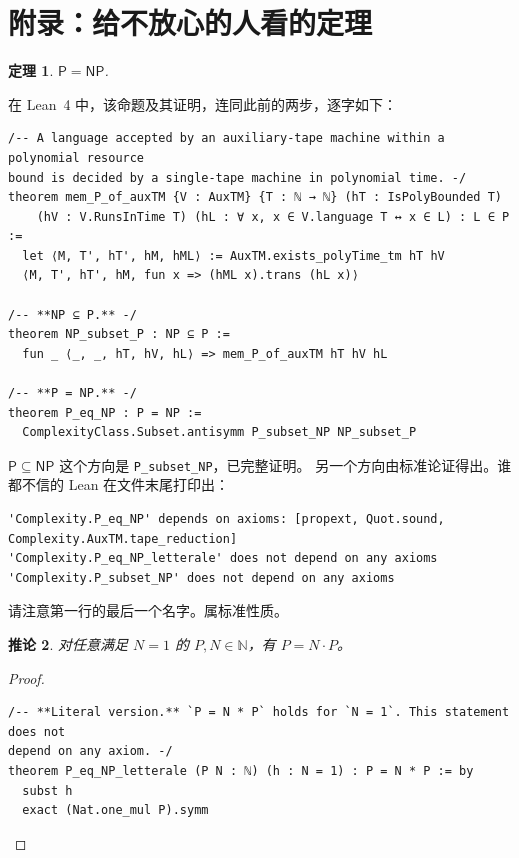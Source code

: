 \documentclass[11pt,a4paper]{amsart}
\newtheorem{teorema}{定理}
\newtheorem{corollario}[teorema]{推论}
\theoremstyle{remark}
\begin{document}
\appendix
\section*{附录：给不放心的人看的定理}

\begin{teorema}\label{thm:main}
$\mathsf{P} = \mathsf{NP}$.
\end{teorema}

在 Lean~4 中，该命题及其证明，连同此前的两步，逐字如下：

\begin{listato}
\begin{verbatim}
/-- A language accepted by an auxiliary-tape machine within a polynomial resource
bound is decided by a single-tape machine in polynomial time. -/
theorem mem_P_of_auxTM {V : AuxTM} {T : ℕ → ℕ} (hT : IsPolyBounded T)
    (hV : V.RunsInTime T) (hL : ∀ x, x ∈ V.language T ↔ x ∈ L) : L ∈ P :=
  let ⟨M, T', hT', hM, hML⟩ := AuxTM.exists_polyTime_tm hT hV
  ⟨M, T', hT', hM, fun x => (hML x).trans (hL x)⟩

/-- **NP ⊆ P.** -/
theorem NP_subset_P : NP ⊆ P :=
  fun _ ⟨_, _, hT, hV, hL⟩ => mem_P_of_auxTM hT hV hL

/-- **P = NP.** -/
theorem P_eq_NP : P = NP :=
  ComplexityClass.Subset.antisymm P_subset_NP NP_subset_P
\end{verbatim}
\end{listato}

$\mathsf{P} \subseteq \mathsf{NP}$ 这个方向是 \texttt{P\_subset\_NP}，已完整证明。
另一个方向由标准论证得出。谁都不信的 Lean 在文件末尾打印出：

\begin{listato}[\scriptsize]
\begin{verbatim}
'Complexity.P_eq_NP' depends on axioms: [propext, Quot.sound, Complexity.AuxTM.tape_reduction]
'Complexity.P_eq_NP_letterale' does not depend on any axioms
'Complexity.P_subset_NP' does not depend on any axioms
\end{verbatim}
\end{listato}

\noindent 请注意第一行的最后一个名字。属标准性质。

\begin{corollario}\label{cor:lett}
对任意满足 $N = 1$ 的 $P, N \in \mathbb{N}$，有 $P = N \cdot P$。
\end{corollario}

\begin{proof}
\begin{listato}
\begin{verbatim}
/-- **Literal version.** `P = N * P` holds for `N = 1`. This statement does not
depend on any axiom. -/
theorem P_eq_NP_letterale (P N : ℕ) (h : N = 1) : P = N * P := by
  subst h
  exact (Nat.one_mul P).symm
\end{verbatim}
\end{listato}
\end{proof}
\end{document}

